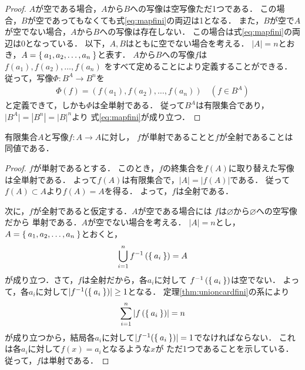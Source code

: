    \begin{proof}
     $A$が空である場合，$A$から$B$への写像は空写像ただ1つである．
     この場合，$B$が空であってもなくても式\eqref{eq:mapfini}の両辺は1となる．
     また，$B$が空で$A$が空でない場合，$A$から$B$への写像は存在しない．
     この場合は式\eqref{eq:mapfini}の両辺は0となっている．
     以下，$A,B$はともに空でない場合を考える．
     $\lvert A \rvert =n$とおき，$A= \Set{a_1,a_2, \ldots , a_n }$と表す．
     $A$から$B$への写像$f$は$f(a_1) , f(a_2), \ldots , f(a_n)$
     をすべて定めることにより定義することができる．
     従って，写像$\varPhi : B^A \longrightarrow B^n$を
     \begin{align*}
       \varPhi (f) = ( f(a_1), f(a_2) , \ldots , f(a_n )) \quad \left ( f \in B^A \right)
     \end{align*}
     と定義できて，しかも$\varPhi$は全単射である．
     従って$B^A$は有限集合であり，
     $\lvert B^A \rvert =\left \lvert B ^n \right \rvert = \left \lvert B \right \rvert ^n$より
     式\eqref{eq:mapfini}が成り立つ．
   \end{proof}



   \begin{thm} \label{thm:finikihon}
     有限集合$A$と写像$f: A \longrightarrow A$に対し，
     $f$が単射であることと$f$が全射であることは同値である．
   \end{thm}

   \begin{proof}
     $f$が単射であるとする．
     このとき，$f$の終集合を$f(A)$に取り替えた写像は全単射である．
     よって$f(A)$は有限集合で，$\lvert A \rvert = \lvert f(A) \rvert$である．
     従って$f(A) \subset A$より$f(A) = A$を得る．
     よって，$f$は全射である．

     次に，$f$が全射であると仮定する．$A$が空である場合には
     $f$は$\varnothing$から$\varnothing$への空写像だから
     単射である．$A$が空でない場合を考える．
     $\lvert A \rvert = n$とし，
     $A= \Set{a_1,  a_2,  \ldots ,  a_n}$とおくと，
     \begin{align*}
       \bigcup_{i=1}^{n} f^{-1} \left ( \Set{a_i} \right ) = A
     \end{align*}
     が成り立つ．さて，$f$は全射だから，各$a_i$に対して
     $f^{-1} \left ( \Set{a_i} \right )$は空でない．
     よって，各$a_i$に対して$\lvert f^{-1}(\Set{a_i}) \rvert \geq 1$となる．
     定理\ref{thm:unioncardfini}の系により
     \begin{align*}
       \sum_{i=1}^n \left \lvert f \left ( \Set{a_i} \right ) \right \rvert = n
     \end{align*}
     が成り立つから，結局各$a_i$に対して$\lvert f^{-1}(\Set{a_i}) \rvert = 1$でなければならない．
     これは各$a_i$に対して$f(x) = a_i$となるような$x$が
     ただ1つであることを示している．
     従って，$f$は単射である．
   \end{proof}

